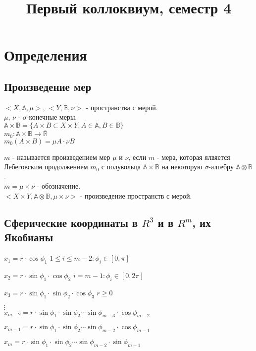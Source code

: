 \documentclass[paper=a4, fontsize=14pt]{report}
\author{}
\title{Первый коллоквиум, семестр 4}
\begin{document}
\maketitle
\tableofcontents
\newpage

\chapter{Определения}

\section{Произведение мер}
$<X, \mathds{A}, \mu>$, $<Y, \mathds{B}, \nu>$ - пространства с мерой.\\
$\mu$, $\nu$ - $\sigma$-конечные меры.\\
$\mathds{A} \times \mathds{B} = \{A\times B \subset X \times Y : A \in \mathds{A}, B \in \mathds{B} \}$ \\
$m_0 : \mathds{A} \times \mathds{B} \rightarrow \overline{\mathds{R}}$\\ $m_0(A \times B) = \mu A \cdot \nu B$

$m$ - называется произведением мер $\mu$ и $\nu$, если $m$ - мера, которая ялвяется Лебеговским продолжением $m_0$ с полукольца $\mathds{A} \times \mathds{B}$ на некоторую $\sigma$-алгебру $\mathds{A} \otimes \mathds{B}$.\\
$m = \mu \times \nu$ - обозначение. \\
$<X \times Y, \mathds{A} \otimes \mathds{B}, \mu \times \nu>$ - произведение пространств с мерой.

\section{Сферические координаты в $ R^3 $ и в $ R^m $, их Якобианы}
$x_1 = r \cdot \cos \phi_1$
\hfill
$1 \leq i \leq m-2: \phi_i \in [0,\pi]$

$x_2 = r \cdot \sin \phi_1 \cdot \cos \phi_2$
\hfill
$i=m-1: \phi_i \in [0,2\pi]$

$x_3 = r \cdot \sin \phi_1 \cdot \sin \phi_2 \cdot \cos \phi_3$
\hfill
$r \geq 0$

$\vdots$\\
$x_{m-2} = r \cdot \sin \phi_1 \cdot \sin \phi_2 \cdots \sin \phi_{m-3} \cdot \cos \phi_{m-2}$

$x_{m-1} = r \cdot \sin \phi_1 \cdot \sin \phi_2 \cdots \sin \phi_{m-2} \cdot \cos \phi_{m-1}$

$x_{m} = r \cdot \sin \phi_1 \cdot \sin \phi_2 \cdots \sin \phi_{m-2} \cdot \sin \phi_{m-1}$\\
\end{document}

